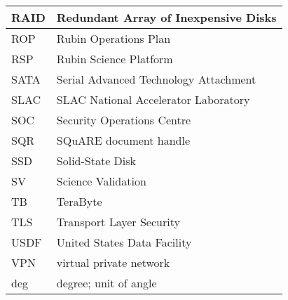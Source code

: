 \begin{longtable}{p{}p{}}
RAID & Redundant Array of Inexpensive Disks \\\hline
ROP & Rubin Operations Plan \\\hline
RSP & Rubin Science Platform \\\hline
SATA & Serial Advanced Technology Attachment \\\hline
SLAC & SLAC National Accelerator Laboratory \\\hline
SOC & Security Operations Centre \\\hline
SQR & SQuARE document handle \\\hline
SSD & Solid-State Disk \\\hline
SV & Science Validation \\\hline
TB & TeraByte \\\hline
TLS & Transport Layer Security \\\hline
USDF & United States Data Facility \\\hline
VPN & virtual private network \\\hline
deg & degree; unit of angle \\\hline
\end{longtable}
